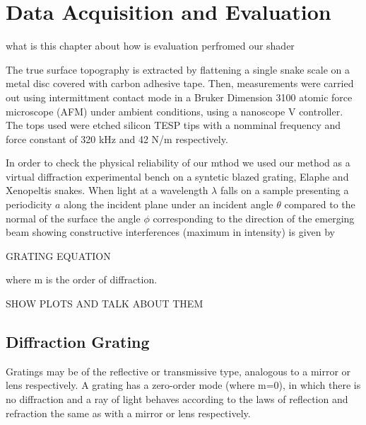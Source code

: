 \section{Data Acquisition and Evaluation}

what is this chapter about
how is evaluation perfromed
our shader


The true surface topography is extracted by flattening a single snake scale on a metal disc covered with carbon adhesive tape. Then, measurements were carried out using intermittment contact mode in a Bruker Dimension 3100 atomic force microscope (AFM) under ambient conditions, using a nanoscope V controller. The tops used were etched silicon TESP tips with a nomminal frequency and force constant of 320 kHz and 42 N/m respectively. 

In order to check the physical reliability of our mthod we used our method as a virtual diffraction experimental bench on a syntetic blazed grating, Elaphe and Xenopeltis snakes. When light at a wavelength $\lambda$ falls on a sample presenting a periodicity $a$ along the incident plane under an incident angle $\theta$ compared to the normal of the surface the angle $\phi$ corresponding to the direction of the emerging beam showing constructive interferences (maximum in intensity) is given by

GRATING EQUATION

where m is the order of diffraction. 

SHOW PLOTS AND TALK ABOUT THEM




\subsection{Diffraction Grating}
Gratings may be of the reflective or transmissive type, analogous to a mirror or lens respectively. A grating has a zero-order mode (where m=0), in which there is no diffraction and a ray of light behaves according to the laws of reflection and refraction the same as with a mirror or lens respectively.


